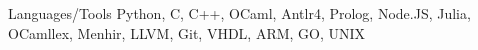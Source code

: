 


\begin{cvskills}


\cvskill
{Languages/Tools} %
{Python, C, C++, OCaml, Antlr4, Prolog, Node.JS, Julia, OCamllex, Menhir, LLVM, Git, VHDL, ARM, GO, UNIX}



\end{cvskills}